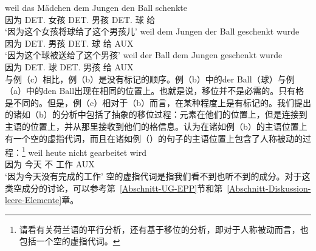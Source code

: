 \eal
\label{ex-passive-German-no-movement}
\ex 
\gll weil das Mädchen dem Jungen den Ball schenkte\\
     因为 DET.\nom{} 女孩 DET.\dat{} 男孩 DET.\acc{} 球 给\\
\glt `因为这个女孩将球给了这个男孩儿'
\ex 
\gll weil dem Jungen der Ball geschenkt wurde\\
	 因为 DET.\dat{} 男孩 DET.\nom{} 球 给 AUX\\
\glt `因为这个球被送给了这个男孩'
\ex 
\gll weil der Ball dem Jungen geschenkt wurde\\
     因为 DET.\nom{} 球 DET.\dat{} 男孩 给 AUX\\
\zl
与例（c）相比，例（b）是没有标记的顺序。例（b）中的der Ball（球）与例（a）中的den Ball出现在相同的位置上。也就是说，移位并不是必需的。只有格是不同的。但是，例（c）相对于（b）而言，在某种程度上是有标记的。我们提出的诸如（b）的分析中包括了抽象的移位过程：元素在他们的位置上，但是连接到主语的位置上，并从那里接收到他们的格信息。\citet[]{Grewendorf93}认为在诸如例（b）的主语位置上有一个空的虚指代词，而且在诸如例（）的句子的主语位置上包含了人称被动的过程：\footnote{
请看有关荷兰语的平行分析，还有基于移位的分析，即对于人称被动而言，也包括一个空的虚指代词。
}
\ea
\gll weil heute nicht gearbeitet wird\\
	 因为 今天 不 工作 AUX\\
\glt `因为今天没有完成的工作'
\z
空的虚指代词是指我们看不到也听不到的成分。对于这类空成分的讨论，可以参考第~\ref{Abschnitt-UG-EPP}节和第~\ref{Abschnitt-Diskussion-leere-Elemente}章。

